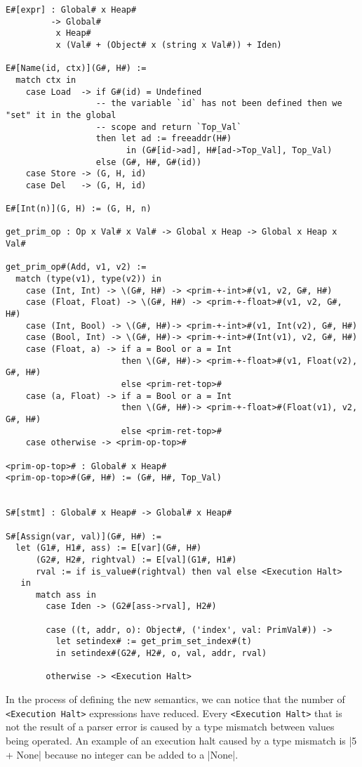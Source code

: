 \begin{verbatim}
E#[expr] : Global# x Heap#
         -> Global#
          x Heap#
          x (Val# + (Object# x (string x Val#)) + Iden)

E#[Name(id, ctx)](G#, H#) :=
  match ctx in
    case Load  -> if G#(id) = Undefined
                  -- the variable `id` has not been defined then we "set" it in the global
                  -- scope and return `Top_Val`
                  then let ad := freeaddr(H#)
                        in (G#[id->ad], H#[ad->Top_Val], Top_Val)
                  else (G#, H#, G#(id))
    case Store -> (G, H, id)
    case Del   -> (G, H, id)

E#[Int(n)](G, H) := (G, H, n)

get_prim_op : Op x Val# x Val# -> Global x Heap -> Global x Heap x Val#

get_prim_op#(Add, v1, v2) :=
  match (type(v1), type(v2)) in
    case (Int, Int) -> \(G#, H#) -> <prim-+-int>#(v1, v2, G#, H#)
    case (Float, Float) -> \(G#, H#) -> <prim-+-float>#(v1, v2, G#, H#)
    case (Int, Bool) -> \(G#, H#)-> <prim-+-int>#(v1, Int(v2), G#, H#)
    case (Bool, Int) -> \(G#, H#)-> <prim-+-int>#(Int(v1), v2, G#, H#)
    case (Float, a) -> if a = Bool or a = Int
                       then \(G#, H#)-> <prim-+-float>#(v1, Float(v2), G#, H#)
                       else <prim-ret-top>#
    case (a, Float) -> if a = Bool or a = Int
                       then \(G#, H#)-> <prim-+-float>#(Float(v1), v2, G#, H#)
                       else <prim-ret-top>#
    case otherwise -> <prim-op-top>#

<prim-op-top># : Global# x Heap#
<prim-op-top>#(G#, H#) := (G#, H#, Top_Val)


S#[stmt] : Global# x Heap# -> Global# x Heap#

S#[Assign(var, val)](G#, H#) :=
  let (G1#, H1#, ass) := E[var](G#, H#)
      (G2#, H2#, rightval) := E[val](G1#, H1#)
      rval := if is_value#(rightval) then val else <Execution Halt>
   in
      match ass in
        case Iden -> (G2#[ass->rval], H2#)

        case ((t, addr, o): Object#, ('index', val: PrimVal#)) ->
          let setindex# := get_prim_set_index#(t)
          in setindex#(G2#, H2#, o, val, addr, rval)

        otherwise -> <Execution Halt>
\end{verbatim}

In the process of defining the new semantics, we can notice that the number of
\verb+<Execution Halt>+ expressions have reduced. Every \verb+<Execution Halt>+ that is
not the result of a parser error is caused by a type mismatch between values being
operated. An example of an execution halt caused by a type mismatch is \pycode|5 + None|
because no integer can be added to a \pycode|None|.

